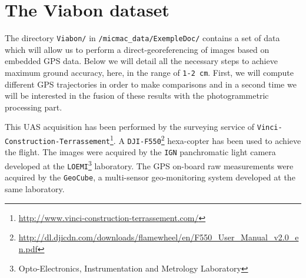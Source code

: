 \section{The Viabon dataset}
The directory {\tt Viabon/} in {\tt /micmac\_data/ExempleDoc/} contains a set of data which will allow us to perform a direct-georeferencing of images based on embedded GPS data. Below we will detail all the necessary steps to achieve maximum ground accuracy, here, in the range of {\tt 1-2 cm}. First, we will compute different GPS trajectories in order to make comparisons and in a second time we will be interested in the fusion of these results with the photogrammetric processing part.\newline

This UAS acquisition has been performed by the surveying service of {\tt Vinci-Construction-Terrassement}\footnote{\url{http://www.vinci-construction-terrassement.com/}}. A {\tt DJI-F550}\footnote{\url{http://dl.djicdn.com/downloads/flamewheel/en/F550_User_Manual_v2.0_en.pdf}} hexa-copter has been used to achieve the flight. The images were acquired by the {\tt IGN} panchromatic light camera developed at the {\tt LOEMI}\footnote{Opto-Electronics, Instrumentation and Metrology Laboratory} laboratory. The GPS on-board raw measurements were acquired by the {\tt GeoCube}, a multi-sensor geo-monitoring system developed at the same laboratory.\newline


